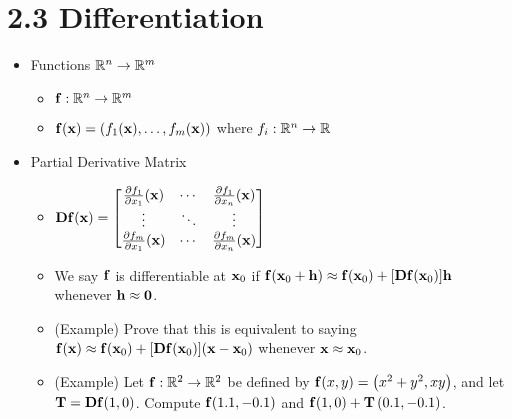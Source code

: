 \documentclass[11pt]{article}
\begin{document}

\section*{2.3 Differentiation}

\begin{itemize}
  \item Functions \(\mathbb R^n\to\mathbb R^m\)
    \begin{itemize}
      \item \(\mathbf{f}:\mathbb R^n\to\mathbb R^m\)
      \item
        \(
          \mathbf{f}(\mathbf{x})
            =
          \left(f_1(\mathbf{x}),\dots,f_m(\mathbf{x})\right)
        \) where \(f_i:\mathbb R^n\to \mathbb R\)
    \end{itemize}
  \item Partial Derivative Matrix %
    \begin{itemize}
      \item
        \(\displaystyle
          \mathbf{D}\mathbf{f}(\mathbf{x})
            =
          \begin{bmatrix}
            \frac{\partial f_1}{\partial x_1}(\mathbf{x}) &
            \cdots &
            \frac{\partial f_1}{\partial x_n}(\mathbf{x})
            \\
            \vdots & \ddots & \vdots
            \\
            \frac{\partial f_m}{\partial x_1}(\mathbf{x}) &
            \cdots &
            \frac{\partial f_m}{\partial x_n}(\mathbf{x})
          \end{bmatrix}
        \)
      \item
        We say \(\mathbf{f}\) is differentiable at \(\mathbf{x}_0\) if
        \(
          \mathbf{f}(\mathbf{x}_0+\mathbf{h})
            \approx
          \mathbf{f}(\mathbf{x}_0)+[\mathbf{D}\mathbf{f}(\mathbf{x}_0)]\mathbf{h}
        \)
        whenever \(\mathbf{h} \approx \mathbf{0}\).
      \item (Example) Prove that this is equivalent to saying
        \(
          \mathbf{f}(\mathbf{x})
            \approx
          \mathbf{f}(\mathbf{x}_0)+[\mathbf{D}\mathbf{f}(\mathbf{x}_0)](\mathbf{x}-\mathbf{x}_0)
        \)
        whenever \(\mathbf{x}\approx\mathbf{x}_0\).
      \item (Example) Let \(\mathbf{f}:\mathbb R^2\to\mathbb R^2\) be defined by
        \(\mathbf{f}(x,y)=\left(x^2+y^2,xy\right)\), and let
        \(\mathbf{T}=\mathbf{D}\mathbf{f}(1,0)\). Compute
        \(\mathbf{f}(1.1,-0.1)\) and \(\mathbf{f}(1,0)+\mathbf{T}\left(0.1,-0.1\right)\).

\end{itemize}
\end{itemize}
\end{document}
